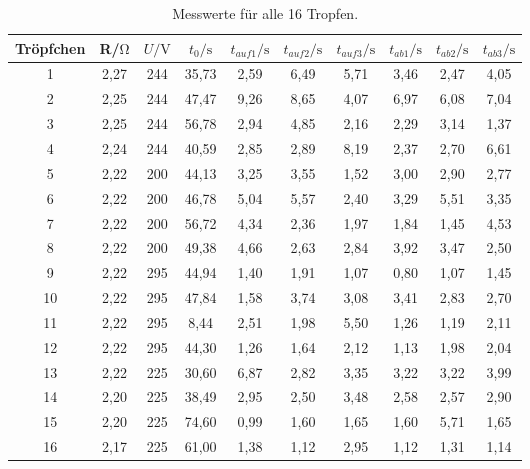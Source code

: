 \begin{table}[H]
    \centering
    \caption{Messwerte für alle 16 Tropfen.}
    \label{tab:Messwerte}
    \begin{tabular}{S[table-format=2] S[table-format=1.2] S[table-format=3] S[table-format=2.2]S[table-format=1.2]S[table-format=1.2]S[table-format=1.2]S[table-format=1.2]S[table-format=1.2]S[table-format=1.2]}
        \toprule
        {Tröpfchen}&{R/$\unit{\ohm}$}&{$U/\unit{\volt}$}&{$t_0/\unit{\s}$}&{$t_{auf1}/\unit{\s}$}&{$t_{auf2}/\unit{\s}$}&{$t_{auf3}/\unit{\s}$}&{$t_{ab1}/\unit{\s}$}&{$t_{ab2}/\unit{\s}$}&{$t_{ab3}/\unit{\s}$}\\
         & 2,27 & 244 & 35,73 & 2,59 & 6,49 & 5,71 & 3,46 & 2,47 & 4,05 \\
        2 & 2,25 & 244 & 47,47 & 9,26 & 8,65 & 4,07 & 6,97 & 6,08 & 7,04 \\
        3 & 2,25 & 244 & 56,78 & 2,94 & 4,85 & 2,16 & 2,29 & 3,14 & 1,37 \\
        4 & 2,24 & 244 & 40,59 & 2,85 & 2,89 & 8,19 & 2,37 & 2,70 & 6,61 \\
        5 & 2,22 & 200 & 44,13 & 3,25 & 3,55 & 1,52 & 3,00 & 2,90 & 2,77 \\
        6 & 2,22 & 200 & 46,78 & 5,04 & 5,57 & 2,40 & 3,29 & 5,51 & 3,35 \\
        7 & 2,22 & 200 & 56,72 & 4,34 & 2,36 & 1,97 & 1,84 & 1,45 & 4,53 \\
        8 & 2,22 & 200 & 49,38 & 4,66 & 2,63 & 2,84 & 3,92 & 3,47 & 2,50 \\
        9 & 2,22 & 295 & 44,94 & 1,40 & 1,91 & 1,07 & 0,80 & 1,07 & 1,45 \\
        10 & 2,22 & 295 & 47,84 & 1,58 & 3,74 & 3,08 & 3,41 & 2,83 & 2,70 \\
        11 & 2,22 & 295 & 8,44 & 2,51 & 1,98 & 5,50 & 1,26 & 1,19 & 2,11 \\
        12 & 2,22 & 295 & 44,30 & 1,26 & 1,64 & 2,12 & 1,13 & 1,98 & 2,04 \\
        13 & 2,22 & 225 & 30,60 & 6,87 & 2,82 & 3,35 & 3,22 & 3,22 & 3,99 \\
        14 & 2,20 & 225 & 38,49 & 2,95 & 2,50 & 3,48 & 2,58 & 2,57 & 2,90 \\
        15 & 2,20 & 225 & 74,60 & 0,99 & 1,60 & 1,65 & 1,60 & 5,71 & 1,65 \\
        16 & 2,17 & 225 & 61,00 & 1,38 & 1,12 & 2,95 & 1,12 & 1,31 & 1,14 \\
        \bottomrule
    \end{tabular}
  \end{table}

